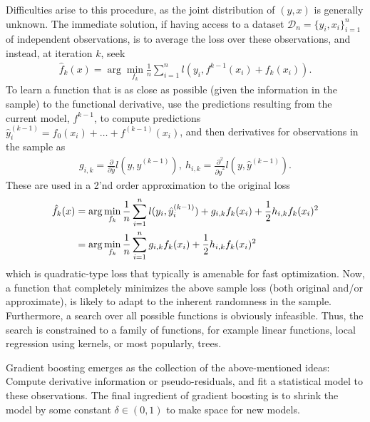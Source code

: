 Difficulties arise to this procedure, as the joint distribution of $(y,x)$ is generally unknown.
The immediate solution, if having access to a dataset $\mathcal{D}_n=\{y_i,x_i\}_{i=1}^n$ of independent observations, is to average the loss over these observations, and instead, at iteration $k$, seek
\begin{align}
	\hat{f}_k(x) = \arg\min_{f_k} \frac{1}{n}\sum_{i=1}^{n} l\left( y_i, f^{k-1}(x_i)+f_k(x_i) \right).
\end{align}
To learn a function that is as close as possible (given the information in the sample) to the functional derivative, use the predictions resulting from the current model, $f^{k-1}$, to compute predictions $\hat{y}_i^{(k-1)}=f_0(x_i)+\dots+f^{(k-1)}(x_i)$, and then derivatives for observations in the sample as 
\begin{align}
g_{i,k} = \frac{\partial}{\partial \hat{y}}l(y,\hat{y}^{(k-1)})
,~
h_{i,k} = \frac{\partial^2}{\partial \hat{y}^2}l(y,\hat{y}^{(k-1)}).
\end{align}
These are used in a 2'nd order approximation to the original loss
\begin{align}
	\hat{f}_k(x) &= \arg\min_{f_k}
	\frac{1}{n}\sum_{i=1}^{n}l(y_i,\hat{y}_i^{(k-1)}) + g_{i,k}f_k(x_i) + \frac{1}{2}h_{i,k}f_k(x_i)^2
	\notag \\
	&= \arg\min_{f_k} \frac{1}{n}\sum_{i=1}^{n} g_{i,k}f_k(x_i) + \frac{1}{2}h_{i,k}f_k(x_i)^2
\end{align}
which is quadratic-type loss that typically is amenable for fast optimization.
Now, a function that completely minimizes the above sample loss (both original and/or approximate), is likely to adapt to the inherent randomness in the sample.
Furthermore, a search over all possible functions is obviously infeasible.
Thus, the search is constrained to a family of functions, for example linear functions, local regression using kernels, or most popularly, trees.


Gradient boosting emerges as the collection of the above-mentioned ideas: Compute derivative information or pseudo-residuals, and fit a statistical model to these observations.
The final ingredient of gradient boosting is to shrink the model by some constant $\delta\in(0,1)$ to make space for new models.


